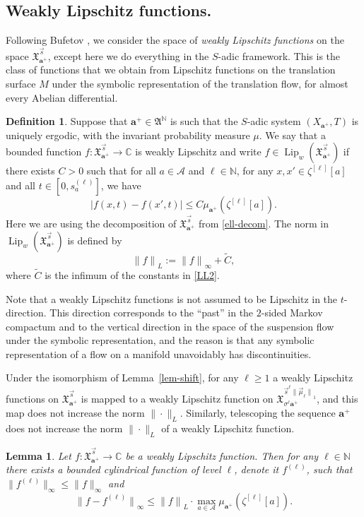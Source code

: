 \documentclass[11pt]{article}
\numberwithin{equation}{section}\newcommand{\Relation}[2][]{}\newtheorem*{prop*}{Proposition}
\let\mathcal\mathscr
\theoremstyle{plain}
\newtheorem{lemma}[theorem]{Lemma}
\theoremstyle{definition}
\newtheorem{defi}[theorem]{Definition}
\let\wt\widetilde
\DeclareMathOperator{\Lip}{Lip}
\newcommand\bom{{\boldsymbol a}}\let\ba\bom
\let\sig\sigma
\newcommand\FrA{\mathfrak{A}}
\newcommand\Xx{\mathfrak{X}}
\newcommand\Ak{\mathcal{A}}
\newcommand{\C}{\mathbb{C}}
\newcommand{\N}{\mathbb{N}}
\newcommand\be{\begin{equation}}
\newcommand\ee{\end{equation}}
\begin{document}
\subsection{Weakly Lipschitz functions.} \label{sec-weakl}
Following Bufetov \cite{Bufetov1, Buf-umn}, we consider the space of \emph{weakly Lipschitz functions} on the space $\Xx_{\ba^+}^{\vec{s}}$, except here we do everything in the $S$-adic framework. This is the class of functions that we obtain from Lipschitz functions on the translation surface $M$ under the symbolic representation of the translation flow, for almost every Abelian
differential.

\begin{defi}
Suppose that $\ba^+\in \FrA^\N$ is such that the $S$-adic system $(X_{\ba^+},T)$ is uniquely ergodic, with the invariant probability measure $\mu$.
We say that a bounded function $f:\Xx_{\ba^+}^{\vec{s}}\to \C$ is weakly Lipschitz and write $f\in \Lip_w (\Xx_{\ba^+}^{\vec{s}})$
if there exists $C>0$ such that for all $a\in \Ak$ and $\ell\in \N$, for any $x,x'\in \zeta^{[\ell]}[a]$ and all $t\in [0, s_a^{(\ell)}]$, we have
\be \label{LL2}
|f(x,t)-f(x',t)|\le C \mu_{\ba^+}(\zeta^{[\ell]}[a]).
\ee
Here we are using the decomposition of $\Xx_{\ba^+}^{\vec{s}}$ from \eqref{ell-decom}.
The norm in $\Lip_w (\Xx_{\ba^+}^{\vec{s}})$ is defined by
\be \label{Lip-norm}
{\|f\|}_L:= {\|f\|}_\infty + \wt{C},
\ee
where $\wt{C}$ is the infimum of the constants in \eqref{LL2}.
\end{defi}

Note that a weakly Lipschitz functions is not assumed to be Lipschitz in the $t$\nobreakdash-direction. This direction corresponds to the ``past'' in the $2$-sided Markov compactum and to the vertical direction in the space of the suspension flow under the symbolic representation, and the reason is that any symbolic representation of a flow on a manifold unavoidably has discontinuities.

Under the isomorphism of Lemma~\ref{lem-shift}, for any $\ell\ge 1$ a weakly Lipschitz functions on $\Xx_{\ba^+}^{\vec{s}}$ is mapped to a weakly Lipschitz function on
$\Xx_{\sig^\ell\ba^+}^{\vec{s}^{\ell}{\|\vec \mu_\ell\|}_1}$, and this map does not increase the norm $\|\cdot\|_L$. Similarly, telescoping the sequence $\ba^+$ does not increase the norm $\|\cdot\|_L$
of a weakly Lipschitz function.

\begin{lemma} \label{lem-approx}
Let $f:\Xx_{\ba^+}^{\vec{s}}\to \C$ be a weakly Lipschitz function. Then for any $\ell\in \N$ there exists a bounded cylindrical function of level $\ell$, denote it $f^{(\ell)}$, such that
$\|f^{(\ell)}\|_\infty \le \|f\|_\infty$ and
\[
{\|f - f^{(\ell)}\|}_\infty \le {\|f\|}_L\cdot \max_{a\in \Ak} \mu_{\bom^+}(\zeta^{[\ell]}[a]).
\]
\end{lemma}
\end{document}
